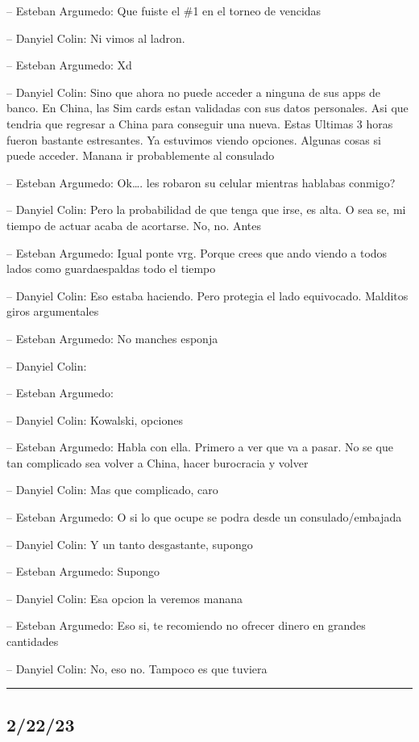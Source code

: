 -- Esteban Argumedo: Que fuiste el \#1 en el torneo de vencidas

-- Danyiel Colin: Ni vimos al ladron.

-- Esteban Argumedo: Xd

-- Danyiel Colin: Sino que ahora no puede acceder a ninguna de sus apps
de banco. En China, las Sim cards estan validadas con sus datos
personales. Asi que tendria que regresar a China para conseguir una
nueva. Estas Ultimas 3 horas fueron bastante estresantes. Ya estuvimos
viendo opciones. Algunas cosas si puede acceder. Manana ir probablemente
al consulado

-- Esteban Argumedo: Ok\ldots. les robaron su celular mientras hablabas
conmigo?

-- Danyiel Colin: Pero la probabilidad de que tenga que irse, es alta. O
sea se, mi tiempo de actuar acaba de acortarse. No, no. Antes

-- Esteban Argumedo: Igual ponte vrg. Porque crees que ando viendo a
todos lados como guardaespaldas todo el tiempo

-- Danyiel Colin: Eso estaba haciendo. Pero protegia el lado equivocado.
Malditos giros argumentales

-- Esteban Argumedo: No manches esponja

-- Danyiel Colin:

-- Esteban Argumedo:

-- Danyiel Colin: Kowalski, opciones

-- Esteban Argumedo: Habla con ella. Primero a ver que va a pasar. No se
que tan complicado sea volver a China, hacer burocracia y volver

-- Danyiel Colin: Mas que complicado, caro

-- Esteban Argumedo: O si lo que ocupe se podra desde un
consulado/embajada

-- Danyiel Colin: Y un tanto desgastante, supongo

-- Esteban Argumedo: Supongo

-- Danyiel Colin: Esa opcion la veremos manana

-- Esteban Argumedo: Eso si, te recomiendo no ofrecer dinero en grandes
cantidades

-- Danyiel Colin: No, eso no. Tampoco es que tuviera

\begin{center}\rule{0.5\linewidth}{0.5pt}\end{center}

\hypertarget{section-186}{%
\subsection{2/22/23}\label{section-186}}

